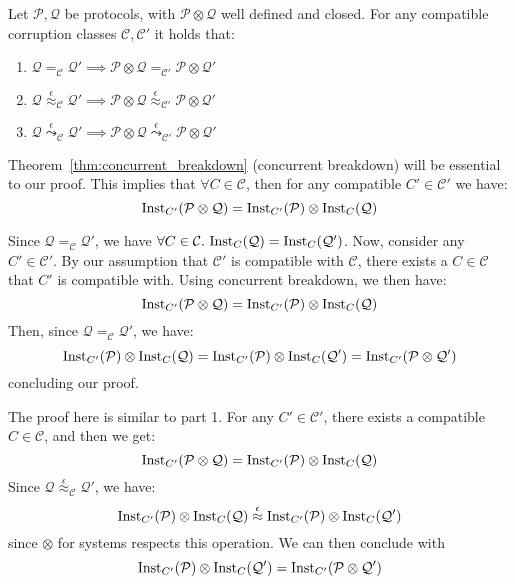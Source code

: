 \begin{theorem}
  Let $\mathcal{P}, \mathcal{Q}$ be protocols, with $\mathcal{P} \otimes \mathcal{Q}$
  well defined and closed. For any compatible corruption classes $\mathcal{C}, \mathcal{C}'$
  it holds that:
  \begin{enumerate}
    \item $\mathcal{Q} =_{\mathcal{C}} \mathcal{Q}' \implies \mathcal{P} \otimes \mathcal{Q} =_{\mathcal{C}'} \mathcal{P} \otimes \mathcal{Q}'$
    \item $\mathcal{Q} \overset{\epsilon}{\approx}_{\mathcal{C}} \mathcal{Q}' \implies \mathcal{P} \otimes \mathcal{Q} \overset{\epsilon}{\approx}_{\mathcal{C}'} \mathcal{P} \otimes \mathcal{Q}'$
    \item $\mathcal{Q} \overset{\epsilon}{\leadsto}_{\mathcal{C}} \mathcal{Q}' \implies \mathcal{P} \otimes \mathcal{Q} \overset{\epsilon}{\leadsto}_{\mathcal{C}'} \mathcal{P} \otimes \mathcal{Q}'$
  \end{enumerate}

   Theorem~\ref{thm:concurrent_breakdown} (concurrent breakdown)
  will be essential to our proof.
  This implies that $\forall C \in \mathcal{C}$, then for any compatible $C' \in \mathcal{C}'$
  we have:
  $$
  \text{Inst}_{C'}(\mathcal{P} \otimes \mathcal{Q}) = \text{Inst}_{C'}(\mathcal{P}) \otimes \text{Inst}_{C}(\mathcal{Q})
  $$

Since $\mathcal{Q} =_{\mathcal{C}} \mathcal{Q}'$, we have $\forall C \in \mathcal{C}.\ \tx{Inst}_C(\mathcal{Q}) = \tx{Inst}_C(\mathcal{Q}')$.
Now, consider any $C' \in \mathcal{C}'$.
By our assumption that $\mathcal{C}'$ is compatible with $\mathcal{C}$,
there exists a $C \in \mathcal{C}$ that $C'$ is compatible with.
Using concurrent breakdown, we then have:
$$
\text{Inst}_{C'}(\mathcal{P} \otimes \mathcal{Q}) =
\text{Inst}_{C'}(\mathcal{P}) \otimes \text{Inst}_C(\mathcal{Q})
$$
Then, since $\mathcal{Q} =_{\mathcal{C}} \mathcal{Q}'$, we have:
$$
\text{Inst}_{C'}(\mathcal{P}) \otimes \text{Inst}_C(\mathcal{Q}) =
\text{Inst}_{C'}(\mathcal{P}) \otimes \text{Inst}_C(\mathcal{Q}') =
\text{Inst}_{C'}(\mathcal{P} \otimes \mathcal{Q}')
$$
concluding our proof.

The proof here is similar to part 1.
For any $C' \in \mathcal{C}'$, there exists a compatible $C \in \mathcal{C}$,
and then we get:
$$
\text{Inst}_{C'}(\mathcal{P} \otimes \mathcal{Q}) =
\text{Inst}_{C'}(\mathcal{P}) \otimes \text{Inst}_C(\mathcal{Q})
$$
Since $\mathcal{Q} \overset{\epsilon}{\approx}_{\mathcal{C}} \mathcal{Q}'$,
we have:
$$
\text{Inst}_{C'}(\mathcal{P}) \otimes \text{Inst}_C(\mathcal{Q})
\overset{\epsilon}{\approx} 
\text{Inst}_{C'}(\mathcal{P}) \otimes \text{Inst}_C(\mathcal{Q}')
$$
since $\otimes$ for systems respects this operation.
We can then conclude with
$$
\text{Inst}_{C'}(\mathcal{P}) \otimes \text{Inst}_C(\mathcal{Q}') =
\text{Inst}_{C'}(\mathcal{P} \otimes \mathcal{Q}')
$$


\end{theorem}
